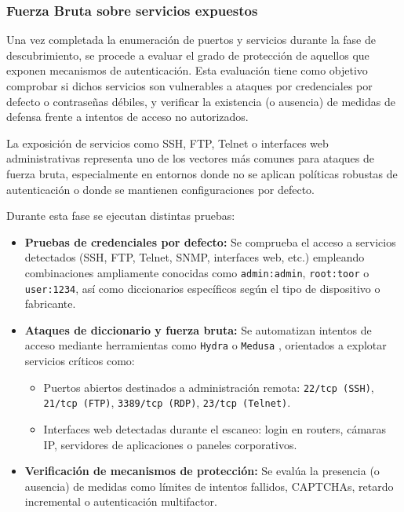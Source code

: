 \documentclass[a4paper, 11pt]{article}
\begin{document}


\subsubsection{Fuerza Bruta sobre servicios expuestos}

Una vez completada la enumeración de puertos y servicios durante la fase de descubrimiento, se procede a evaluar el grado de protección de aquellos que exponen mecanismos de autenticación. Esta evaluación tiene como objetivo comprobar si dichos servicios son vulnerables a ataques por credenciales por defecto o contraseñas débiles, y verificar la existencia (o ausencia) de medidas de defensa frente a intentos de acceso no autorizados.

La exposición de servicios como SSH, FTP, Telnet o interfaces web administrativas representa uno de los vectores más comunes para ataques de fuerza bruta, especialmente en entornos donde no se aplican políticas robustas de autenticación o donde se mantienen configuraciones por defecto.

Durante esta fase se ejecutan distintas pruebas:

\begin{itemize}
\item \textbf{Pruebas de credenciales por defecto:} Se comprueba el acceso a servicios detectados (SSH, FTP, Telnet, SNMP, interfaces web, etc.) empleando combinaciones ampliamente conocidas como \texttt{admin:admin}, \texttt{root:toor} o \texttt{user:1234}, así como diccionarios específicos según el tipo de dispositivo o fabricante.
    \item \textbf{Ataques de diccionario y fuerza bruta:} Se automatizan intentos de acceso mediante herramientas como \texttt{Hydra} o \texttt{Medusa} , orientados a explotar servicios críticos como:
   
    \begin{itemize}
        \item Puertos abiertos destinados a administración remota: \texttt{22/tcp (SSH)}, \texttt{21/tcp (FTP)}, \texttt{3389/tcp (RDP)}, \texttt{23/tcp (Telnet)}.
        \item Interfaces web detectadas durante el escaneo: login en routers, cámaras IP, servidores de aplicaciones o paneles corporativos.
    \end{itemize}

    \item \textbf{Verificación de mecanismos de protección:} Se evalúa la presencia (o ausencia) de medidas como límites de intentos fallidos, CAPTCHAs, retardo incremental o autenticación multifactor.
\end{itemize}
\end{document}
